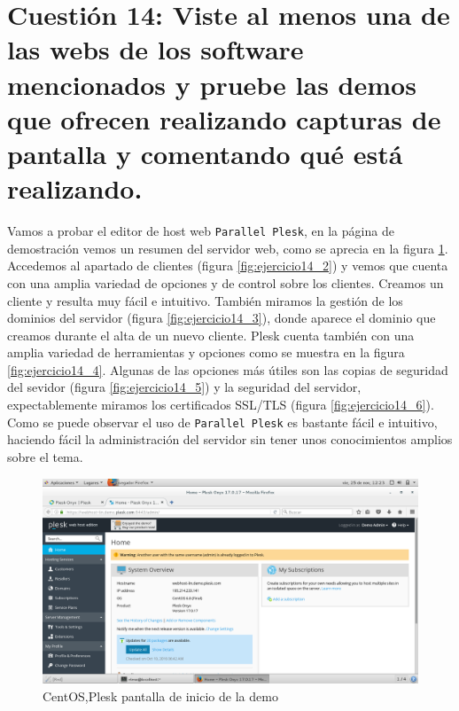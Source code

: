
\section{Cuestión 14: Viste al menos una de las webs de los software mencionados y pruebe las demos que ofrecen realizando capturas de pantalla y comentando qué está realizando.}
Vamos a probar el editor de host web \texttt{Parallel Plesk}, en la página de demostración vemos un resumen del servidor web, como se aprecia en la figura \ref{fig:ejercicio14_1}. Accedemos al apartado de clientes (figura \ref{fig:ejercicio14_2}) y vemos que cuenta con una amplia variedad de opciones y de control sobre los clientes. Creamos un cliente y resulta muy fácil e intuitivo. También miramos la gestión de los dominios del servidor (figura \ref{fig:ejercicio14_3}), donde aparece el dominio que creamos durante el alta de un nuevo cliente. Plesk cuenta también con una amplia variedad de herramientas y opciones como se muestra en la figura \ref{fig:ejercicio14_4}. Algunas de las opciones más útiles son las copias de seguridad del sevidor (figura \ref{fig:ejercicio14_5}) y la seguridad del servidor, expectablemente miramos los certificados SSL/TLS (figura \ref{fig:ejercicio14_6}).\\

Como se puede observar el uso de \texttt{Parallel Plesk} es bastante fácil e intuitivo, haciendo fácil la administración del servidor sin tener unos conocimientos amplios sobre el tema.


\begin{figure}[H] 
	\centering
	\includegraphics[width=15cm]{./img/ejercicio14_1.png} 	
	\caption{CentOS,Plesk pantalla de inicio de la demo} \label{fig:ejercicio14_1}
\end{figure}


